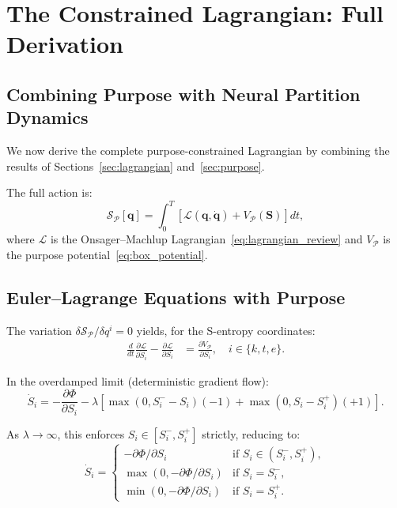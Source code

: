 \documentclass[aps,prd,twocolumn,superscriptaddress,floatfix,nofootinbib]{revtex4-2}
\theoremstyle{remark}
\newcommand{\Svec}{\mathbf{S}}
\newcommand{\qvec}{\mathbf{q}}
\newcommand{\Lag}{\mathcal{L}}
\newcommand{\Action}{\mathcal{S}}
\newcommand{\Pot}{\Phi}
\newcommand{\Purpose}{\mathcal{P}}
\begin{document}
\section{The Constrained Lagrangian: Full Derivation}
\label{sec:full_lagrangian}

\subsection{Combining Purpose with Neural Partition Dynamics}

We now derive the complete purpose-constrained Lagrangian by combining the results of Sections~\ref{sec:lagrangian} and~\ref{sec:purpose}.

The full action is:
\begin{equation}
\boxed{\Action_\Purpose[\qvec] = \int_0^T \left[\Lag(\qvec, \dot{\qvec}) + V_\Purpose(\Svec)\right] dt,}
\label{eq:full_action}
\end{equation}
where $\Lag$ is the Onsager--Machlup Lagrangian~\eqref{eq:lagrangian_review} and $V_\Purpose$ is the purpose potential~\eqref{eq:box_potential}.

\subsection{Euler--Lagrange Equations with Purpose}

The variation $\delta \Action_\Purpose / \delta q^i = 0$ yields, for the S-entropy coordinates:
\begin{align}
\frac{d}{dt}\frac{\partial \Lag}{\partial \dot{S}_i} - \frac{\partial \Lag}{\partial S_i} &= \frac{\partial V_\Purpose}{\partial S_i}, \quad i \in \{k,t,e\}.
\label{eq:full_EL_S}
\end{align}

In the overdamped limit (deterministic gradient flow):
\begin{equation}
\dot{S}_i = -\frac{\partial \Pot}{\partial S_i} - \lambda \left[\max(0, S_i^- - S_i)(- 1) + \max(0, S_i - S_i^+)(+1)\right].
\label{eq:overdamped_S}
\end{equation}

As $\lambda \to \infty$, this enforces $S_i \in [S_i^-, S_i^+]$ strictly, reducing to:
\begin{equation}
\dot{S}_i = \begin{cases}
-\partial \Pot / \partial S_i & \text{if } S_i \in (S_i^-, S_i^+), \\
\max(0, -\partial \Pot / \partial S_i) & \text{if } S_i = S_i^-, \\
\min(0, -\partial \Pot / \partial S_i) & \text{if } S_i = S_i^+.
\end{cases}
\label{eq:projected_flow}
\end{equation}
\end{document}
